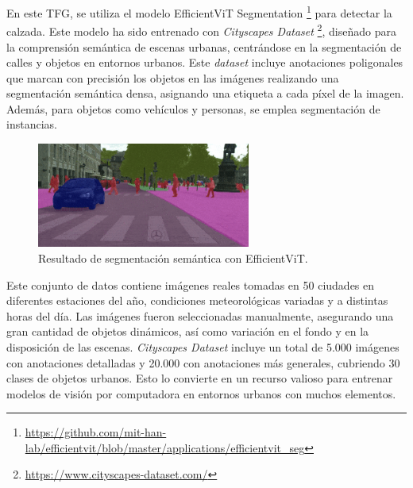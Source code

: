 En este \ac{TFG}, se utiliza el modelo EfficientViT Segmentation \footnote{\url{ https://github.com/mit-han-lab/efficientvit/blob/master/applications/efficientvit_seg}}  para detectar la calzada. Este modelo ha sido entrenado con \textit{Cityscapes Dataset} \footnote{\url{https://www.cityscapes-dataset.com/}}, diseñado para la comprensión semántica de escenas urbanas, centrándose en la segmentación de calles y objetos en entornos urbanos. Este \textit{dataset} incluye anotaciones poligonales que marcan con precisión los objetos en las imágenes realizando una segmentación semántica densa, asignando una etiqueta a cada píxel de la imagen. Además, para objetos como vehículos y personas, se emplea segmentación de instancias.

\begin{figure}[ht]
  \begin{center}
    \includegraphics[width=7cm]{figs/Plataformas_Desarollo/resultado_ef.png}
  \end{center}
  \caption{Resultado de segmentación semántica con EfficientViT.}
  \label{foto_ef}
\end{figure}

Este conjunto de datos contiene imágenes reales tomadas en 50 ciudades en diferentes estaciones del año, condiciones meteorológicas variadas y a distintas horas del día. Las imágenes fueron seleccionadas manualmente, asegurando una gran cantidad de objetos dinámicos, así como variación en el fondo y en la disposición de las escenas. \textit{Cityscapes Dataset} incluye un total de 5.000 imágenes con anotaciones detalladas y 20.000 con anotaciones más generales, cubriendo 30 clases de objetos urbanos. Esto lo convierte en un recurso valioso para entrenar modelos de visión por computadora en entornos urbanos con muchos elementos.
 
